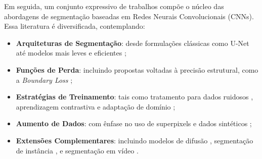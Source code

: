 Em seguida, um conjunto expressivo de trabalhos \cite{jha2020kvasirseg, emara2019liteseg, zhang2023attention, wang2021boundary, liao2023dual, gansbeke2021unsupervised, yang2018curriculum, hoffman2016unsupervised, zhang2019spda, franchi2021robust, zhang2020dualwindow, delarosa2022improving, baranchuk2021label, wang2020solo, han2020dvsnet} compõe o núcleo das abordagens de segmentação baseadas em Redes Neurais Convolucionais (CNNs). Essa literatura é diversificada, contemplando:



\begin{itemize}
\item \textbf{Arquiteturas de Segmentação}: desde formulações clássicas como U-Net \cite{jha2020kvasirseg} até modelos mais leves e eficientes \cite{emara2019liteseg, zhang2023attention};
\item \textbf{Funções de Perda}: incluindo propostas voltadas à precisão estrutural, como a \textit{Boundary Loss} \cite{wang2021boundary};
\item \textbf{Estratégias de Treinamento}: tais como tratamento para dados ruidosos \cite{liao2023dual}, aprendizagem contrastiva \cite{gansbeke2021unsupervised} e adaptação de domínio \cite{yang2018curriculum, hoffman2016unsupervised};
\item \textbf{Aumento de Dados}: com ênfase no uso de superpixels \cite{zhang2019spda, franchi2021robust, zhang2020dualwindow} e dados sintéticos \cite{delarosa2022improving};
\item \textbf{Extensões Complementares}: incluindo modelos de difusão \cite{baranchuk2021label}, segmentação de instância \cite{wang2020solo}, e segmentação em vídeo \cite{han2020dvsnet}.
\end{itemize}


